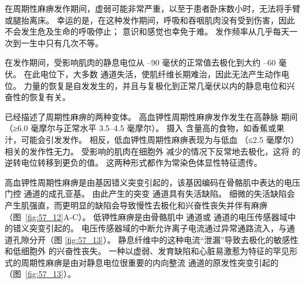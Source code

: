 在周期性麻痹发作期间，虚弱可能非常严重，以至于患者卧床数小时，无法将手臂或腿抬离床。
幸运的是，在这种发作期间，呼吸和吞咽肌肉没有受到伤害，因此不会发生危及生命的呼吸停止；
意识和感觉也幸免于难。
发作频率从几乎每天一次到一生中只有几次不等。


在发作期间，受影响肌肉的静息电位从 –90 毫伏的正常值去极化到大约 –60 毫伏。
在此电位下，大多数  通道失活，使肌纤维长期难治，因此无法产生动作电位。
力量的恢复是自发发生的，并且与复极化到正常几毫伏以内的静息电位和兴奋性的恢复有关。


已经描述了周期性麻痹的两种变体。
高血钾性周期性麻痹发作发生在高静脉  期间（≥6.0 毫摩尔与正常水平 3.5–4.5 毫摩尔）。
摄入  含量高的食物，如香蕉或果汁，可能会引发发作。
相反，低血钾性周期性麻痹表现为与低血 （≤2.5 毫摩尔）相关的发作性无力。
受影响的肌肉在细胞外  减少的情况下反常地去极化，这将  的逆转电位转移到更负的值。
这两种形式都作为常染色体显性特征遗传。


高血钾性周期性麻痹是由基因错义突变引起的，该基因编码在骨骼肌中表达的电压门控  通道的成孔亚基。
由此产生的突变  通道具有失活缺陷。
细微的失活缺陷会产生肌强直，而更明显的缺陷会导致慢性去极化和兴奋性丧失并伴有麻痹（图~\ref{fig:57_12}A-C）。
低钾性麻痹是由骨骼肌中  通道或  通道的电压传感器域中的错义突变引起的。
电压传感器域的中断允许离子电流通过异常通路流入，与通道孔隙分开（图 \ref{fig:57_13}）。
静息纤维中的这种电流“泄漏”导致去极化的敏感性和低细胞外  的兴奋性丧失。
一种以虚弱、发育缺陷和心脏易激惹为特征的罕见形式的周期性麻痹是由对静息电位很重要的内向整流  通道的原发性突变引起的（图~\ref{fig:57_13}）。


